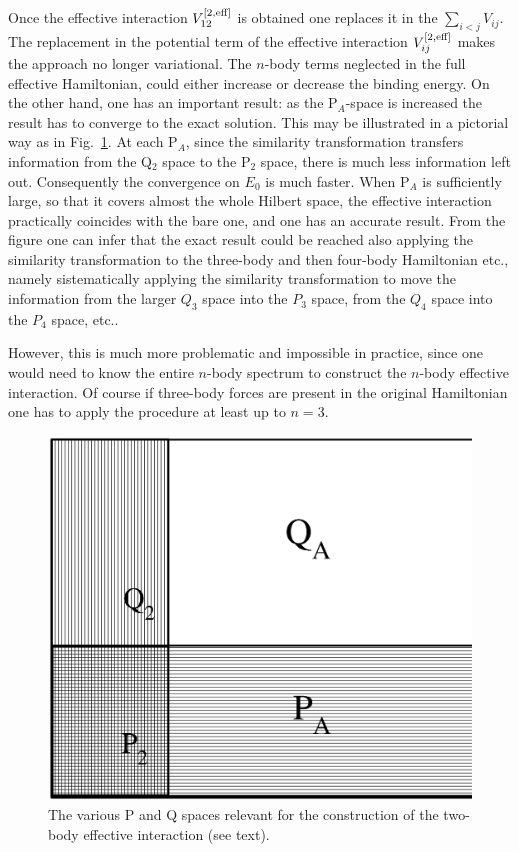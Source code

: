 Once the effective interaction $ V_{12}^{\rm [2,eff]}$ is obtained one replaces it in the $\sum_{i<j} V_{ij}$.
The replacement in the potential term of the effective interaction $ V_{ij}^{\rm [2,eff]}$ 
makes the approach no longer  variational. 
The $n$-body terms neglected in the full effective Hamiltonian, could either increase
or decrease the binding energy. On the other hand, one has an important result: as the P${\!_A}$-space  is increased
the result has to converge to the exact solution.
This may be illustrated in a pictorial way as in Fig.~\ref{fig:1}. At each P$_{\!A}$,  since
the similarity transformation transfers information from the Q$_{2}$ space
to the P$_2$ space, there is much less information left out. Consequently the convergence on $E_0$ is much faster. 
When  P$_{\!\!A}$ is  sufficiently large, so that it covers almost the 
whole Hilbert space, the effective interaction practically coincides  with the bare one, and one has an accurate result. 
From the figure one can infer that the exact result could be reached also applying the similarity transformation to the 
three-body and then four-body  Hamiltonian etc., namely sistematically applying the similarity transformation to
move the information from the larger $Q_3$ space into the
$P_3$ space, from the $Q_4$ space into the $P_4$ space, etc..

However, this is much more problematic and  impossible in practice, since one would need to
know the entire $n$-body spectrum to construct the $n$-body effective interaction. 
Of course if three-body forces are present in the original Hamiltonian one has 
to apply the  procedure at least up to $n=3$.  
\begin{figure}
\sidecaption
\includegraphics[scale=.65]{Chapter7-figures/fig1.eps}
%
%
\caption{The various P and Q spaces relevant for the construction
of the two-body effective interaction (see text).}
\label{fig:1}       %
\end{figure}

